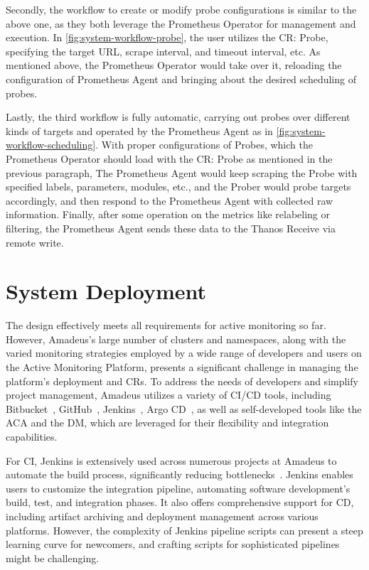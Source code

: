 Secondly, the workflow to create or modify probe configurations is similar to the above one, as they both leverage the Prometheus Operator for management and execution. In \autoref{fig:system-workflow-probe}, the user utilizes the \ac{CR}: Probe, specifying the target \ac{URL}, scrape interval, and timeout interval, etc. As mentioned above, the Prometheus Operator would take over it, reloading the configuration of Prometheus Agent and bringing about the desired scheduling of probes. 

Lastly, the third workflow is fully automatic, carrying out probes over different kinds of targets and operated by the Prometheus Agent as in \autoref{fig:system-workflow-scheduling}. With proper configurations of Probes, which the Prometheus Operator should load with the \ac{CR}: Probe as mentioned in the previous paragraph, The Prometheus Agent would keep scraping the Probe with specified labels, parameters, modules, etc., and the Prober would probe targets accordingly, and then respond to the Prometheus Agent with collected raw information. Finally, after some operation on the metrics like relabeling or filtering, the Prometheus Agent sends these data to the Thanos Receive via remote write. 

\section{System Deployment}

The design effectively meets all requirements for active monitoring so far. However, Amadeus's large number of clusters and namespaces, along with the varied monitoring strategies employed by a wide range of developers and users on the Active Monitoring Platform, presents a significant challenge in managing the platform's deployment and \ac{CR}s. To address the needs of developers and simplify project management, Amadeus utilizes a variety of \ac{CI}/\ac{CD} tools, including Bitbucket~\parencite{atlassianBitbucketGitSolution}, GitHub~\parencite{BuildSoftwareBetter}, Jenkins~\parencite{Jenkins}, Argo CD~\parencite{ArgoCDDeclarative}, as well as self-developed tools like the \ac{ACA} and the \ac{DM}, which are leveraged for their flexibility and integration capabilities. 

For \ac{CI}, Jenkins is extensively used across numerous projects at Amadeus to automate the build process, significantly reducing bottlenecks~\parencite{elazharyUncoveringBenefitsChallenges2022}. Jenkins enables users to customize the integration pipeline, automating software development's build, test, and integration phases. It also offers comprehensive support for \ac{CD}, including artifact archiving and deployment management across various platforms. However, the complexity of Jenkins pipeline scripts can present a steep learning curve for newcomers, and crafting scripts for sophisticated pipelines might be challenging. 

